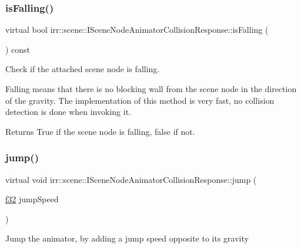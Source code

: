 \subsubsection{\texorpdfstring{is\+Falling()}{isFalling()}\hspace{0.1cm}{\footnotesize\ttfamily [2/2]}}
{\footnotesize\ttfamily virtual bool irr\+::scene\+::\+I\+Scene\+Node\+Animator\+Collision\+Response\+::is\+Falling (\begin{DoxyParamCaption}{ }\end{DoxyParamCaption}) const\hspace{0.3cm}{\ttfamily [pure virtual]}}



Check if the attached scene node is falling. 

Falling means that there is no blocking wall from the scene node in the direction of the gravity. The implementation of this method is very fast, no collision detection is done when invoking it. \begin{DoxyReturn}{Returns}
True if the scene node is falling, false if not. 
\end{DoxyReturn}
\mbox{\label{classirr_1_1scene_1_1ISceneNodeAnimatorCollisionResponse_a409b98d04be89fb06cce3384e0188abf}} 
\subsubsection{\texorpdfstring{jump()}{jump()}\hspace{0.1cm}{\footnotesize\ttfamily [1/2]}}
{\footnotesize\ttfamily virtual void irr\+::scene\+::\+I\+Scene\+Node\+Animator\+Collision\+Response\+::jump (\begin{DoxyParamCaption}\item[{\hyperlink{namespaceirr_a0277be98d67dc26ff93b1a6a1d086b07}{f32}}]{jump\+Speed }\end{DoxyParamCaption})\hspace{0.3cm}{\ttfamily [pure virtual]}}



\textquotesingle{}Jump\textquotesingle{} the animator, by adding a jump speed opposite to its gravity 


